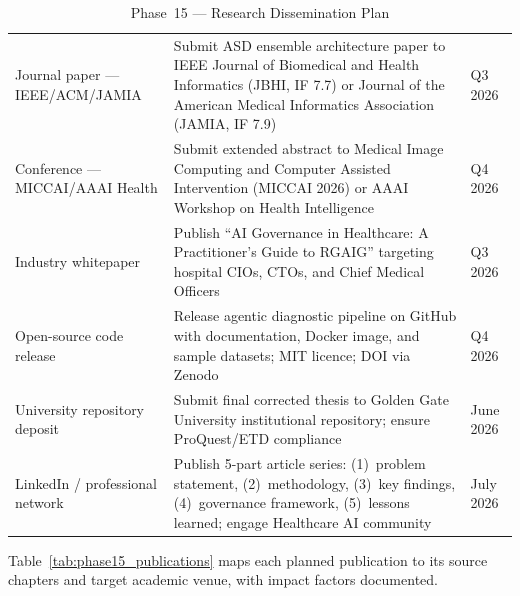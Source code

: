 \begingroup\singlespacing\tablefontsize\tablestripes
\begin{xltabular}{\textwidth}{@{} l X l @{}}
\caption{Phase~15 --- Research Dissemination Plan}
\label{tab:phase15_dissemination}\\
\toprule
{} &  &  \\
\midrule
\endfirsthead
\endhead
\bottomrule
\endlastfoot
Journal paper --- IEEE/ACM/JAMIA           & Submit ASD ensemble architecture paper to IEEE Journal of Biomedical and Health Informatics (JBHI, IF 7.7) or Journal of the American Medical Informatics Association (JAMIA, IF 7.9)                  & Q3 2026 \\
\addlinespace
Conference --- MICCAI/AAAI Health          & Submit extended abstract to Medical Image Computing and Computer Assisted Intervention (MICCAI 2026) or AAAI Workshop on Health Intelligence                                                   & Q4 2026 \\
\addlinespace
Industry whitepaper                        & Publish ``AI Governance in Healthcare: A Practitioner's Guide to RGAIG'' targeting hospital CIOs, CTOs, and Chief Medical Officers                                                             & Q3 2026 \\
\addlinespace
Open-source code release                   & Release agentic diagnostic pipeline on GitHub with documentation, Docker image, and sample datasets; MIT licence; DOI via Zenodo                                                               & Q4 2026 \\
\addlinespace
University repository deposit              & Submit final corrected thesis to Golden Gate University institutional repository; ensure ProQuest/ETD compliance                                                                                & June 2026 \\
\addlinespace
LinkedIn / professional network            & Publish 5-part article series: (1)~problem statement, (2)~methodology, (3)~key findings, (4)~governance framework, (5)~lessons learned; engage Healthcare AI community                         & July 2026 \\
\end{xltabular}
\endgroup

\vspace{1.5em}

Table~\ref{tab:phase15_publications} maps each planned publication to its source chapters and target academic venue, with impact factors documented.

